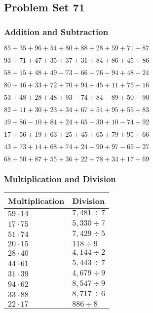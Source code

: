 \hypertarget{problem-set-71}{%
\subsection{Problem Set 71}\label{problem-set-71}}

\hypertarget{addition-and-subtraction}{%
\subsubsection{Addition and
Subtraction}\label{addition-and-subtraction}}

\(85+35+96+54+80+88+28+59+71+87\)

\(93+71+47+35+37+31+84+86+45+86\)

\(58+15+48+49-73-66+76-94+48+24\)

\(80+46+33+72+70+94+45+11+75+16\)

\(53+48+28+48+93-74+84-89+50-90\)

\(82+11+30+23+34+67+54+95+55+83\)

\(49+86-10+84+24+65-30+10-74+92\)

\(17+56+19+63+25+45+65+79+95+66\)

\(43+73+14+68+74+24-90+97-65-27\)

\(68+50+87+55+36+22+78+34+17+69\)

\hypertarget{multiplication-and-division}{%
\subsubsection{Multiplication and
Division}\label{multiplication-and-division}}

\begin{longtable}[]{@{}ll@{}}
\toprule
Multiplication & Division\tabularnewline
\midrule
\endhead
\(59\cdot14\) & \(7,481÷7\)\tabularnewline
\(17\cdot75\) & \(5,330÷7\)\tabularnewline
\(51\cdot74\) & \(7,429÷5\)\tabularnewline
\(20\cdot15\) & \(118÷9\)\tabularnewline
\(28\cdot40\) & \(4,144÷2\)\tabularnewline
\(44\cdot61\) & \(5,443÷7\)\tabularnewline
\(31\cdot39\) & \(4,679÷9\)\tabularnewline
\(94\cdot62\) & \(8,547÷9\)\tabularnewline
\(33\cdot88\) & \(8,717÷6\)\tabularnewline
\(22\cdot17\) & \(886÷8\)\tabularnewline
\bottomrule
\end{longtable}
